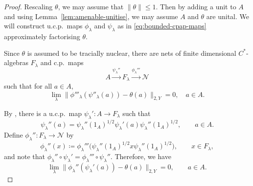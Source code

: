 \documentclass[a4paper,11pt]{amsart}
\theoremstyle{definition}
\numberwithin{equation}{section}
\numberwithin{theorem}{section}
\begin{document}
\begin{proof}
Rescaling $\theta$, we may assume that $\|\theta\| \leq 1$.  
Then by adding a unit to $A$ and using Lemma~\ref{lem:amenable-unitise}, we may assume $A$ and $\theta$ are unital.  We will construct u.c.p.\ maps $\phi_\lambda$ and $\psi_\lambda$ as in \eqref{eq:bounded-cpap-maps} approximately factorising $\theta$.

Since $\theta$ is assumed to be tracially nuclear, there are nets of finite dimensional $C^*$-algebras $F_\lambda$ and c.p.\ maps 
	\begin{equation}
		A \overset{\psi_\lambda''}{\longrightarrow} F_\lambda \overset{\phi_\lambda'''}{\longrightarrow} \mathcal N
	\end{equation}
	such that for all $a \in A$,
	\begin{equation}
		\lim_\lambda \| \phi'''_\lambda(\psi''_\lambda(a)) - \theta(a) \|_{2, Y} = 0, \quad a \in A.
	\end{equation}

	By \cite[Lemma~2.2.5]{Br08}, there is a u.c.p.\ map $\psi_\lambda' \colon A \rightarrow F_\lambda$ such that
	\begin{equation}
		\psi_\lambda''(a) = \psi_\lambda''(1_A)^{1/2} \psi_\lambda'(a) \psi_\lambda''(1_A)^{1/2}, \qquad a \in A.
	\end{equation}
	Define $\phi_\lambda'' \colon F_\lambda \rightarrow \mathcal N$ by
	\begin{equation}
		\phi_\lambda''(x) \coloneqq \phi_\lambda'''\big( \psi_\lambda''(1_A)^{1/2} x \psi_\lambda''(1_A)^{1/2}\big), \qquad x \in F_\lambda,
	\end{equation}
	and note that $\phi_\lambda'' \circ \psi_\lambda' = \phi_\lambda''' \circ \psi_\lambda''$.  Therefore, we have
	\begin{equation}\label{eq:cpap-proof1}
		\lim_\lambda \| \phi_\lambda''(\psi_\lambda'(a)) - \theta(a) \|_{2, Y} = 0, \qquad a \in A.
	\end{equation}	


\end{proof}
\end{document}
